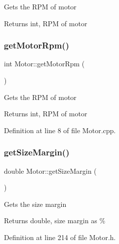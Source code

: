 Gets the R\+PM of motor

\begin{DoxyReturn}{Returns}
int, R\+PM of motor 
\end{DoxyReturn}
\mbox{\label{class_motor_a13826c93b894d699478e34a98ffb35ab}} 
\subsubsection{\texorpdfstring{get\+Motor\+Rpm()}{getMotorRpm()}\hspace{0.1cm}{\footnotesize\ttfamily [3/3]}}
{\footnotesize\ttfamily int Motor\+::get\+Motor\+Rpm (\begin{DoxyParamCaption}{ }\end{DoxyParamCaption})}

Gets the R\+PM of motor

\begin{DoxyReturn}{Returns}
int, R\+PM of motor 
\end{DoxyReturn}


Definition at line 8 of file Motor.\+cpp.

\mbox{\label{class_motor_aff485f55bed5b58d1454ce5c71bc0729}} 
\subsubsection{\texorpdfstring{get\+Size\+Margin()}{getSizeMargin()}\hspace{0.1cm}{\footnotesize\ttfamily [1/3]}}
{\footnotesize\ttfamily double Motor\+::get\+Size\+Margin (\begin{DoxyParamCaption}{ }\end{DoxyParamCaption})\hspace{0.3cm}{\ttfamily [inline]}}

Gets the size margin

\begin{DoxyReturn}{Returns}
double, size margin as \% 
\end{DoxyReturn}


Definition at line 214 of file Motor.\+h.

\mbox{\label{class_motor_aff485f55bed5b58d1454ce5c71bc0729}} 
